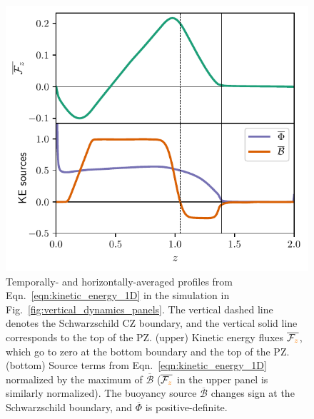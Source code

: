 \documentclass[twocolumn, linenumbers]{aastex631}
\renewcommand{\bar}[1]{\overline{#1}}
\newcommand{\editone}[1]{\textcolor{orange}{#1}}
\begin{document}
\begin{figure}[t!]
\centering
\includegraphics[width=\columnwidth]{theory_profiles.pdf}
\caption{
Temporally- and horizontally-averaged profiles from Eqn.~\ref{eqn:kinetic_energy_1D} in the simulation in Fig.~\ref{fig:vertical_dynamics_panels}.
The vertical dashed line denotes the Schwarzschild CZ boundary, and the vertical solid line corresponds to the top of the PZ.
(upper) Kinetic energy fluxes $\bar{\mathcal{F}_{\editone{z}}}$, which go to zero at the bottom boundary and the top of the PZ.
    (bottom) Source terms from Eqn.~\ref{eqn:kinetic_energy_1D} normalized by the maximum of $\overline{\mathcal{B}}$ ($\bar{\mathcal{F}_{\editone{z}}}$ in the upper panel is similarly normalized).
The buoyancy source $\bar{\mathcal{B}}$ changes sign at the Schwarzschild boundary, and $\bar{\Phi}$ is positive-definite.
\label{fig:theory_profiles}
}
\end{figure}
\end{document}
